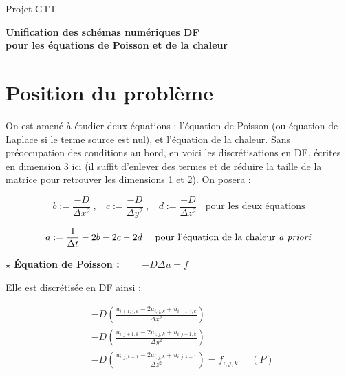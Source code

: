 \documentclass[12pt]{article}
\begin{document}
{\large
{}
\hfill {\sc Projet GTT} \\
}
\vspace{10 mm}
\begin{center}
	\Large{\textbf{Unification des schémas numériques DF}} \\
	\Large{\textbf{pour les équations de Poisson et de la chaleur}}
\end{center}

\vspace{10 mm}

\section{Position du problème}

\noindent
On est amené à étudier deux équations : l'équation de Poisson (ou équation de Laplace si le terme source est nul), et l'équation de la chaleur. Sans préoccupation des conditions au bord, en voici les discrétisations en DF, écrites en dimension 3 ici (il suffit d'enlever des termes et de réduire la taille de la matrice pour retrouver les dimensions 1 et 2). On posera :

\vspace{5 mm}

$$b := \frac{-D}{\Delta x^2}~,~~~~ c := \frac{-D}{\Delta y^2}~,~~~~ d := \frac{-D}{\Delta z^2}~~~~\text{pour les deux équations}$$

$$a := \frac{1}{\Delta t} - 2b - 2c - 2d~~~~\text{pour l'équation de la chaleur \textit{a priori}}$$

\vspace{10 mm}

\noindent
\textbf{$\star$ Équation de Poisson :}~~~~ $- D \Delta u = f$

\vspace{5 mm}

\noindent
Elle est discrétisée en DF ainsi :

\begin{align*}
& -D \left( \frac{u_{i+1,j,k} -2u_{i,j,k} + u_{i-1,j,k}}{\Delta x^2} \right) \\
& -D \left( \frac{u_{i,j+1,k} -2u_{i,j,k} + u_{i,j-1,k}}{\Delta y^2} \right) \\
& -D \left( \frac{u_{i,j,k+1} -2u_{i,j,k} + u_{i,j,k-1}}{\Delta z^2} \right) = f_{i,j,k}~~~~~~(P)
\end{align*}

\vspace{5 mm}
\end{document}

